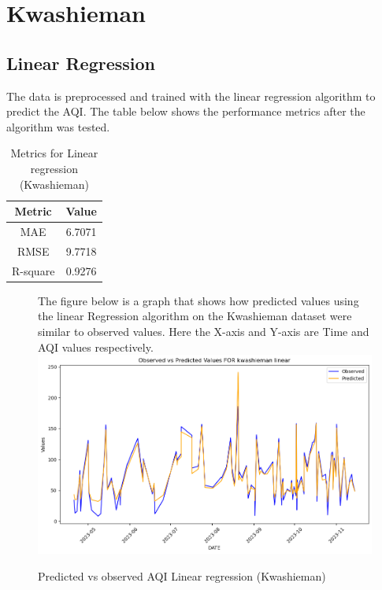 \documentclass{book}
\numberwithin{equation}{section}
\numberwithin{figure}{section}
\begin{document}
\vspace{-5mm} %
\section{Kwashieman}
\label{kwashieman}
\vspace{-5mm} %
\subsection{Linear Regression}
\vspace{-5mm} %
The data is preprocessed and trained with the linear regression algorithm to predict the AQI. The table below shows the performance metrics after the algorithm was tested.\\
\begin{table}[H]
    \centering
    \begin{tabular}{|c|c|}
        \hline
        \textbf{Metric} & \textbf{Value} \\
        \hline
        MAE & 6.7071 \\
        \hline
        RMSE & 9.7718 \\
        \hline
        R-square & 0.9276 \\
        \hline
    \end{tabular}
    \caption{Metrics for Linear regression (Kwashieman)}
    \label{tab: Linear metrics(Kwashieman)}
\end{table}
\begin{figure}[H]
 \begin{minipage}{\linewidth}
        The figure below is a graph that shows how predicted values using the linear Regression algorithm on the Kwashieman dataset were similar to observed values. Here the X-axis and Y-axis are Time and AQI values respectively.
        \vspace{0.5em} 
        \includegraphics[width=\linewidth]{kwashieman linear.png}
       
        \caption{ Predicted vs observed AQI Linear regression (Kwashieman) }
        \label{fig: Linear predicted vs observed AQI(Kwashieman)}
    \end{minipage}
\end{figure}
\end{document}
